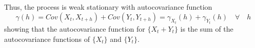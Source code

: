\documentclass[10pt,a4paper]{exam}
\begin{document}
\begin{questions}
\begin{solution}
Thus, the process is weak stationary with autocovariance function
$$\gamma(h) = 
Cov(X_t, X_{t+h}) + Cov(Y_t, Y_{t+h}) = \gamma_{X_t}(h) + \gamma_{Y_t}(h) \quad \forall \quad h$$
showing that the autocovariance function for $\{X_t + Y_t\}$ is the sum of the autocovariance functions of $\{X_t\}$ and $\{Y_t\}$.
\end{solution}
\end{questions}
\end{document}
